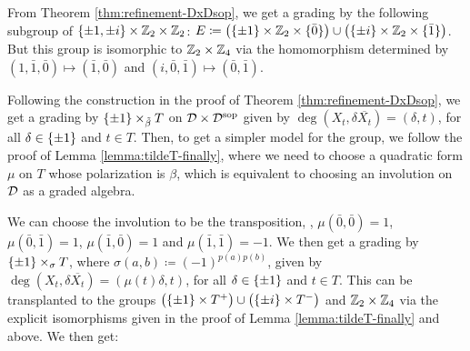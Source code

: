 %
From Theorem \ref{thm:refinement-DxDsop}, we get a grading by the following subgroup of $\{\pm 1, \pm i\} \times \mathbb{Z}_2 \times \mathbb{Z}_2$: $E \coloneqq \big( \{ \pm 1 \} \times \mathbb{Z}_2 \times \{ \bar 0 \} \big) \cup \big( \{ \pm i \} \times \mathbb{Z}_2 \times \{ \bar 1 \} \big)$. 
But this group is isomorphic to $\mathbb{Z}_2 \times \mathbb{Z}_4$ via the homomorphism determined by $(1, \bar 1, \bar 0) \mapsto (\bar 1, \bar 0)$ and $(i, \bar 0, \bar 1) \mapsto (\bar 0, \bar 1)$. 

Following the construction in the proof of Theorem \ref{thm:refinement-DxDsop}, we get a grading by $\{ \pm 1 \} \times_{\tilde\beta} T$ on $\mathcal{D}\times \mathcal{D}^{\mathrm{sop}}$ given by $\deg (X_t, \delta \overline{X_t}) = (\delta, t)$, for all $\delta \in \{ \pm 1 \}$ and $t\in T$. 
Then, to get a simpler model for the group, we follow the proof of Lemma \ref{lemma:tildeT-finally}, where we need to choose a quadratic form $\mu$ on $T$ whose polarization is $\beta$, which is equivalent to choosing an involution on $\mathcal{D}$ as a graded algebra. 

We can choose the involution to be the transposition, \ie, $\mu(\bar 0, \bar 0) = 1$, $\mu(\bar 0, \bar 1) = 1$, $\mu(\bar 1, \bar 0) = 1$ and $\mu(\bar 1, \bar 1) = -1$. 
We then get a grading by $\{ \pm 1 \} \times_\sigma T$, where $\sigma(a,b) \coloneqq (-1)^{p(a)p(b)}$, given by $\deg (X_t, \delta \overline{X_t}) = (\mu(t) \delta, t)$, for all $\delta \in \{ \pm 1 \}$ and $t\in T$. 
This can be transplanted to the groups $\big(\{ \pm 1 \} \times T^+\big) \cup \big(\{\pm i\} \times T^-\big)$ and $\mathbb{Z}_2\times \mathbb{Z}_4$ via the explicit isomorphisms given in the proof of Lemma \ref{lemma:tildeT-finally} and above. 
We then get:

